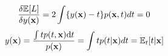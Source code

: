 $$\frac{\delta \mathbb{E}[L]}{\delta y({\bf x})} = 2 \int \{y({\bf x}) -t \}p({\bf x},t)dt = 0$$
$$ y({\bf x}) = \frac{\int tp(t,{\bf x}){\rm d}t}{p({\bf x})}=\int tp(t|{\bf x})dt = \mathbb{E}_{t}[t|{\bf x}]$$
